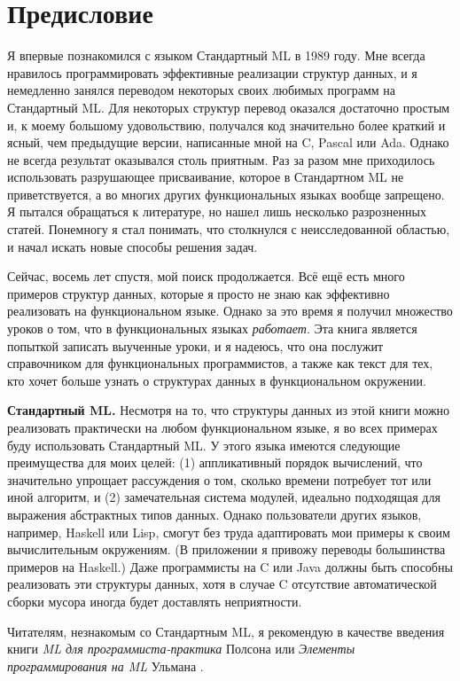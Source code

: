\chapter*{Предисловие}

Я впервые познакомился с языком Стандартный ML в 1989 году. Мне всегда
нравилось программировать эффективные реализации структур данных,
и я немедленно занялся переводом некоторых своих любимых программ
на Стандартный ML. Для некоторых структур перевод оказался достаточно
простым и, к моему большому удовольствию, получался код значительно более краткий
и ясный, чем предыдущие версии, написанные мной на C, Pascal или
Ada.  Однако не всегда результат оказывался столь приятным. Раз за
разом мне приходилось использовать разрушающее присваивание, которое в
Стандартном ML не приветствуется, а во многих других функциональных
языках вообще запрещено.  Я пытался обращаться к литературе, но
нашел лишь несколько разрозненных статей.  Понемногу я стал понимать,
что столкнулся с неисследованной областью, и начал искать новые
способы решения задач.

Сейчас, восемь лет спустя, мой поиск продолжается. Всё ещё есть много
примеров структур данных, которые я просто не знаю как эффективно
реализовать на функциональном языке. Однако за это время я получил
множество уроков о том, что в функциональных языках
\textit{работает}.  Эта книга является попыткой записать выученные
уроки, и я надеюсь, что она послужит справочником для функциональных
программистов, а также как текст для тех, кто хочет больше узнать о
структурах данных в функциональном окружении.

\textbf{Стандартный ML.} Несмотря на то, что структуры данных из этой
книги можно реализовать практически на любом функциональном языке, я
во всех примерах буду использовать Стандартный ML.  У этого языка
имеются следующие преимущества для моих целей: (1)  аппликативный
порядок вычислений, что значительно упрощает рассуждения о том,
сколько времени потребует тот или иной алгоритм, и (2) замечательная
система модулей, идеально подходящая для выражения абстрактных типов
данных.  Однако пользователи других языков, например, Haskell или
Lisp, смогут без труда адаптировать мои примеры к своим вычислительным
окружениям. (В приложении я привожу переводы большинства примеров на
Haskell.) Даже программисты на C или Java должны быть способны
реализовать эти структуры данных, хотя в случае C отсутствие
автоматической сборки мусора иногда будет доставлять неприятности.

Читателям, незнакомым со Стандартным ML, я рекомендую в качестве
введения книги \textit{ML для программиста-практика} Полсона
\cite{Paulson96} или \textit{Элементы программирования на ML}
Ульмана \cite{Ullman94}.

